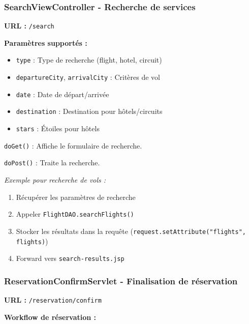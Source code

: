 \documentclass[12pt,a4paper]{report}
\begin{document}
\subsubsection{SearchViewController - Recherche de services}

\textbf{URL :} \texttt{/search}

\textbf{Paramètres supportés :}
\begin{itemize}
    \item \texttt{type} : Type de recherche (flight, hotel, circuit)
    \item \texttt{departureCity}, \texttt{arrivalCity} : Critères de vol
    \item \texttt{date} : Date de départ/arrivée
    \item \texttt{destination} : Destination pour hôtels/circuits
    \item \texttt{stars} : Étoiles pour hôtels
\end{itemize}

\texttt{doGet()} : Affiche le formulaire de recherche.

\texttt{doPost()} : Traite la recherche.

\textit{Exemple pour recherche de vols :}
\begin{enumerate}
    \item Récupérer les paramètres de recherche
    \item Appeler \texttt{FlightDAO.searchFlights()}
    \item Stocker les résultats dans la requête (\texttt{request.setAttribute("flights", flights)})
    \item Forward vers \texttt{search-results.jsp}
\end{enumerate}

\subsubsection{ReservationConfirmServlet - Finalisation de réservation}

\textbf{URL :} \texttt{/reservation/confirm}

\textbf{Workflow de réservation :}
\end{document}

